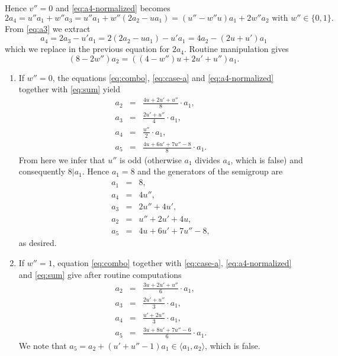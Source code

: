 \documentclass[12pt]{amsart}
\begin{document}
\noindent Hence $v''=0$ and \eqref{eq:a4-normalized} becomes
$$
2a_4= u'' a_1+ w'' a_3= u'' a_1+ w''(2a_2-u a_1)= (u''-w''u)a_1+ 2w'' a_2 \text{ with } w''\in\{0, 1\}.
$$
From \eqref{eq:a3} we extract
$$
a_4= 2a_3-u' a_1= 2(2a_2-u a_1)- u' a_1=4a_2-(2u+u')a_1 
$$ 
which we replace in the previous equation for $2a_4$. Routine manipulation gives
\begin{equation}
\label{eq:combo}
(8-2w'')a_2=((4-w'')u+2u'+u'') a_1.
\end{equation}
\begin{enumerate}[leftmargin=0.5cm,label*=\arabic*.]
\item If \underline{$w''=0$}, the equations \eqref{eq:combo}, \eqref{eq:case-a} and \eqref{eq:a4-normalized} together with \eqref{eq:sum} yield
	\begin{eqnarray*}
	a_2 &=& \frac{4u+2u'+u''}{8} \cdot a_1,  \\
	a_3 &=& \frac{2u'+u''}{4} \cdot a_1,   \\
	a_4 &=& \frac{u''}{2} \cdot a_1,\\
	a_5 &=& \frac{4u+6u'+7u''-8}{8} \cdot a_1.  
	\end{eqnarray*}
	From here we infer that $u''$ is odd (otherwise $a_1$ divides $a_4$, which is false) and consequently $8|a_1$. 
	Hence $a_1=8$ and the generators of the semigroup are  
	\begin{eqnarray}
	\label{eq:sol3}
	a_1 &=& 8, \nonumber \\
	a_4 &=& 4u'',  \nonumber \\
	a_3 &=& 2u''+4u',   \\
	a_2 &=& u''+ 2u'+ 4u,  \nonumber \\
	a_5 &=& 4u+6u'+ 7u''-8,  \nonumber
	\end{eqnarray}
	as desired.
\item If \underline{$w''=1$}, equation \eqref{eq:combo} together with \eqref{eq:case-a},  \eqref{eq:a4-normalized} and \eqref{eq:sum} give after routine computations 
\begin{eqnarray*}
	a_2 &=& \frac{3u+2u'+u''}{6} \cdot a_1,  \\
	a_3 &=& \frac{2u'+u''}{3} \cdot a_1,   \\
	a_4 &=& \frac{u'+2u''}{3} \cdot a_1,\\
	a_5 &=& \frac{3u+8u'+7u''-6}{6} \cdot a_1.  
	\end{eqnarray*}
We note that $a_5= a_2+ (u'+u''-1) a_1 \in \langle a_1, a_2 \rangle$, which is false.	
\end{enumerate}
 
\end{document}

